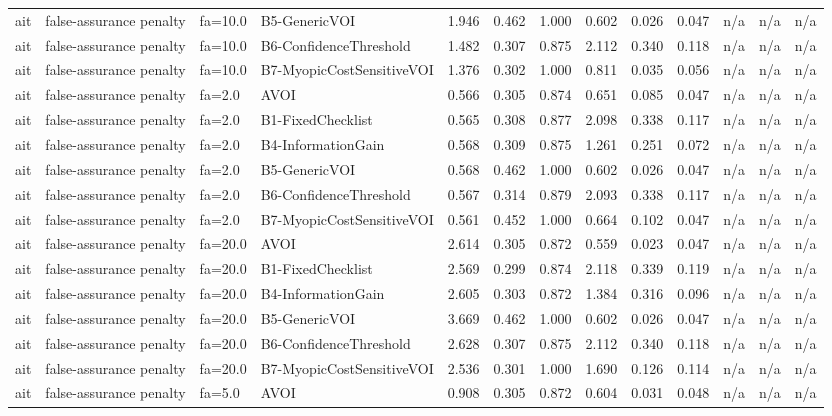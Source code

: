 \begin{table}[!ht]
{\begin{tabular}{lllllllllllll}
ait & false-assurance penalty & fa=10.0 & B5-GenericVOI & 1.946 & 0.462 & 1.000 & 0.602 & 0.026 & 0.047 & n/a & n/a & n/a \\
ait & false-assurance penalty & fa=10.0 & B6-ConfidenceThreshold & 1.482 & 0.307 & 0.875 & 2.112 & 0.340 & 0.118 & n/a & n/a & n/a \\
ait & false-assurance penalty & fa=10.0 & B7-MyopicCostSensitiveVOI & 1.376 & 0.302 & 1.000 & 0.811 & 0.035 & 0.056 & n/a & n/a & n/a \\
ait & false-assurance penalty & fa=2.0 & AVOI & 0.566 & 0.305 & 0.874 & 0.651 & 0.085 & 0.047 & n/a & n/a & n/a \\
ait & false-assurance penalty & fa=2.0 & B1-FixedChecklist & 0.565 & 0.308 & 0.877 & 2.098 & 0.338 & 0.117 & n/a & n/a & n/a \\
ait & false-assurance penalty & fa=2.0 & B4-InformationGain & 0.568 & 0.309 & 0.875 & 1.261 & 0.251 & 0.072 & n/a & n/a & n/a \\
ait & false-assurance penalty & fa=2.0 & B5-GenericVOI & 0.568 & 0.462 & 1.000 & 0.602 & 0.026 & 0.047 & n/a & n/a & n/a \\
ait & false-assurance penalty & fa=2.0 & B6-ConfidenceThreshold & 0.567 & 0.314 & 0.879 & 2.093 & 0.338 & 0.117 & n/a & n/a & n/a \\
ait & false-assurance penalty & fa=2.0 & B7-MyopicCostSensitiveVOI & 0.561 & 0.452 & 1.000 & 0.664 & 0.102 & 0.047 & n/a & n/a & n/a \\
ait & false-assurance penalty & fa=20.0 & AVOI & 2.614 & 0.305 & 0.872 & 0.559 & 0.023 & 0.047 & n/a & n/a & n/a \\
ait & false-assurance penalty & fa=20.0 & B1-FixedChecklist & 2.569 & 0.299 & 0.874 & 2.118 & 0.339 & 0.119 & n/a & n/a & n/a \\
ait & false-assurance penalty & fa=20.0 & B4-InformationGain & 2.605 & 0.303 & 0.872 & 1.384 & 0.316 & 0.096 & n/a & n/a & n/a \\
ait & false-assurance penalty & fa=20.0 & B5-GenericVOI & 3.669 & 0.462 & 1.000 & 0.602 & 0.026 & 0.047 & n/a & n/a & n/a \\
ait & false-assurance penalty & fa=20.0 & B6-ConfidenceThreshold & 2.628 & 0.307 & 0.875 & 2.112 & 0.340 & 0.118 & n/a & n/a & n/a \\
ait & false-assurance penalty & fa=20.0 & B7-MyopicCostSensitiveVOI & 2.536 & 0.301 & 1.000 & 1.690 & 0.126 & 0.114 & n/a & n/a & n/a \\
ait & false-assurance penalty & fa=5.0 & AVOI & 0.908 & 0.305 & 0.872 & 0.604 & 0.031 & 0.048 & n/a & n/a & n/a \\

\end{tabular}}
\end{table}
